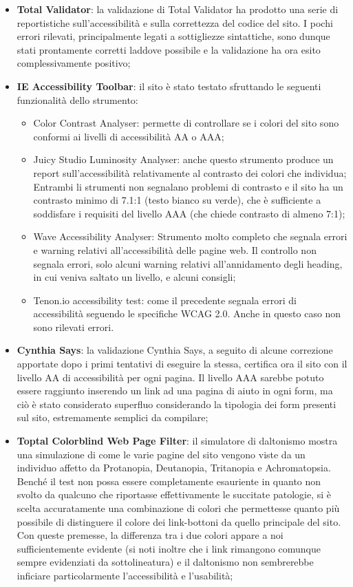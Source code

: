 \documentclass[12pt]{article}
\begin{document}
	\begin{itemize}
		\item \textbf{Total Validator}: la validazione di Total Validator ha prodotto una serie di reportistiche sull'accessibilità e sulla correttezza del codice del sito. I pochi errori rilevati, principalmente legati a sottigliezze sintattiche, sono dunque stati prontamente corretti laddove possibile e la validazione ha ora esito complessivamente positivo;
		\item \textbf{IE Accessibility Toolbar}: il sito è stato testato sfruttando le seguenti funzionalità dello strumento:
		\begin{itemize}
			\item Color Contrast Analyser: permette di controllare se i colori del sito sono conformi ai livelli di accessibilità AA o AAA; 
			\item Juicy Studio Luminosity Analyser: anche questo strumento produce un report sull'accessibilità relativamente al contrasto dei colori che individua; Entrambi li strumenti non segnalano problemi di contrasto e il sito ha un contrasto minimo di 7.1:1 (testo bianco su verde), che è sufficiente a soddisfare i requisiti del livello AAA (che chiede contrasto di almeno 7:1);
			\item Wave Accessibility Analyser: Strumento molto completo che segnala errori e warning relativi all'accessibilità delle pagine web. Il controllo non segnala errori, solo alcuni warning relativi all'annidamento degli heading, in cui veniva saltato un livello, e alcuni consigli;
			\item Tenon.io accessibility test: come il precedente segnala errori di accessibilità seguendo le specifiche WCAG 2.0. Anche in questo caso non sono rilevati errori.
		\end{itemize}
		\item \textbf{Cynthia Says}: la validazione Cynthia Says, a seguito di alcune correzione apportate dopo i primi tentativi di eseguire la stessa, certifica ora il sito con il livello AA di accessibilità per ogni pagina. Il livello AAA sarebbe potuto essere raggiunto inserendo un link ad una pagina di aiuto in ogni form, ma ciò è stato considerato superfluo considerando la tipologia dei form presenti sul sito, estremamente semplici da compilare;
		\item \textbf{Toptal Colorblind Web Page Filter}: il simulatore di daltonismo mostra una simulazione di come le varie pagine del sito vengono viste da un individuo affetto da Protanopia, Deutanopia, Tritanopia e Achromatopsia. Benché il test non possa essere completamente esauriente in quanto non svolto da qualcuno che riportasse effettivamente le succitate patologie, si è scelta accuratamente una combinazione di colori che permettesse quanto più possibile di distinguere il colore dei link-bottoni da quello principale del sito. Con queste premesse, la differenza tra i due colori appare a noi sufficientemente evidente (si noti inoltre che i link rimangono comunque sempre evidenziati da sottolineatura) e il daltonismo non sembrerebbe inficiare particolarmente l'accessibilità e l'usabilità;

\end{itemize}
\end{document}
